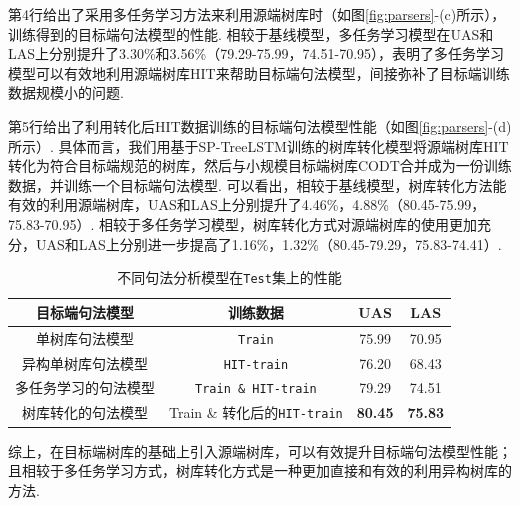 第4行给出了采用多任务学习方法来利用源端树库时（如图\ref{fig:parsers}-(c)所示），训练得到的目标端句法模型的性能. 相较于基线模型，多任务学习模型在UAS和LAS上分别提升了3.30\%和3.56\%（79.29-75.99，74.51-70.95），表明了多任务学习模型可以有效地利用源端树库HIT来帮助目标端句法模型，间接弥补了目标端训练数据规模小的问题.

第5行给出了利用转化后HIT数据训练的目标端句法模型性能（如图\ref{fig:parsers}-(d)所示）. 具体而言，我们用基于SP-TreeLSTM训练的树库转化模型将源端树库HIT转化为符合目标端规范的树库，然后与小规模目标端树库CODT合并成为一份训练数据，并训练一个目标端句法模型. 可以看出，相较于基线模型，树库转化方法能有效的利用源端树库，UAS和LAS上分别提升了4.46\%，4.88\%（80.45-75.99，75.83-70.95）. 相较于多任务学习模型，树库转化方式对源端树库的使用更加充分，UAS和LAS上分别进一步提高了1.16\%，1.32\%（80.45-79.29，75.83-74.41）.

\begin{table}[hb!]
    \centering
    \caption{不同句法分析模型在\texttt{Test}集上的性能}
    \label{tb:final-results-with-converted data}
    \begin{tabular}{ *{4}{c}}%
        \toprule
        目标端句法模型       & 训练数据                            & UAS            & LAS   \\ %
        \midrule
        单树库句法模型       & \texttt{Train}                      & 75.99          & 70.95 \\
        异构单树库句法模型   & \texttt{HIT-train}                  & 76.20          & 68.43 \\
        多任务学习的句法模型 & \texttt{Train \& HIT-train}         & 79.29          & 74.51 \\
        树库转化的句法模型   & Train \& 转化后的\texttt{HIT-train}                          %
                             & \textbf{80.45}                      & \textbf{75.83}         \\
        \bottomrule
    \end{tabular}
\end{table}

综上，在目标端树库的基础上引入源端树库，可以有效提升目标端句法模型性能；且相较于多任务学习方式，树库转化方式是一种更加直接和有效的利用异构树库的方法.

